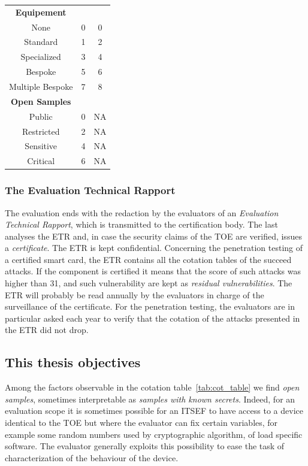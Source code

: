 \begin{table}[]
\begin{tabular}{ccc}
\midrule
\textbf{Equipement}           &                &              \\
None                          & 0              & 0            \\
Standard                      & 1              & 2            \\
Specialized                   & 3              & 4            \\
Bespoke                       & 5              & 6            \\
Multiple Bespoke              & 7              & 8            \\
\midrule
\textbf{Open Samples}         &                &              \\
Public                        & 0              & NA           \\
Restricted                    & 2              & NA           \\
Sensitive                     & 4              & NA           \\
Critical                      & 6              & NA    \\	
\bottomrule      
\end{tabular}
\end{table}


\subsubsection{The Evaluation Technical Rapport}
The evaluation ends with the redaction by the evaluators of an \emph{Evaluation Technical Rapport}, which is transmitted to the certification body. The last analyses the ETR and, in case the security claims of the TOE are verified, issues a \emph{certificate}. The ETR is kept confidential. Concerning the penetration testing of a certified smart card, the ETR contains all the cotation tables of the succeed attacks. If the component is certified it means that the score of such attacks was higher than 31, and such vulnerability are kept as \emph{residual vulnerabilities}. The ETR will probably be read annually by the evaluators in charge of the surveillance of the certificate. For the penetration testing, the evaluators are in particular asked each year to verify that the cotation of the attacks presented in the ETR did not drop.

\subsection{This thesis objectives}
Among the factors observable in the cotation table~\ref{tab:cot_table} we find \emph{open samples}, sometimes interpretable as \emph{samples with known secrets}. Indeed, for an evaluation scope it is sometimes possible for an ITSEF to have access to a device identical to the TOE but where the evaluator can fix certain variables, for example some random numbers used by cryptographic algorithm, of load specific software. The evaluator generally exploits this possibility to ease the task of characterization of the behaviour of the device.\\

